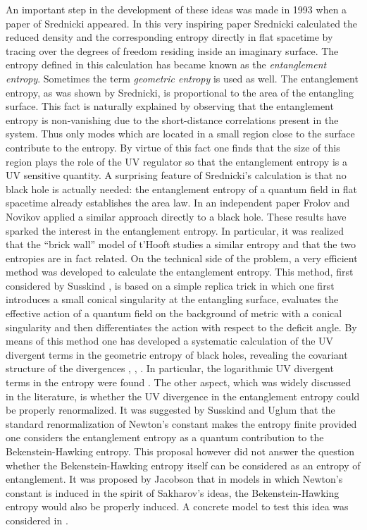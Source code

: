 \documentclass[12pt]{article}
\begin{document}
An important step in the development of these ideas was made in 1993 when a  paper of Srednicki \cite{Srednicki:1993im} appeared. In this very inspiring paper 
Srednicki calculated the reduced density and the corresponding entropy directly in flat spacetime by tracing over the degrees of freedom residing inside  an imaginary surface. 
The entropy defined in this calculation has became known as the {\it entanglement entropy}. Sometimes the term {\it geometric entropy} is used as well. The entanglement entropy, as was shown by Srednicki, is proportional to the area of the entangling surface.  This fact  is naturally explained by observing that the entanglement entropy is non-vanishing due to the
short-distance correlations present in the system. Thus only modes which are located in a small region close to the surface contribute to the entropy. By virtue of this fact one finds that the size of this region plays the role of the UV regulator so that the entanglement entropy is a UV sensitive quantity. A surprising feature of Srednicki's calculation is that no black hole is actually needed: the entanglement entropy of a quantum field in flat spacetime  already establishes the area law. In an independent paper Frolov and Novikov \cite{Frolov:1993ym} applied a  similar approach directly to a black hole.  
These results have sparked the interest in the entanglement entropy. In particular, it was realized that the ``brick wall'' model of t'Hooft studies a similar entropy and that the two entropies are in fact related.  On the technical side of the problem,  a very efficient method was developed  to calculate the entanglement entropy.
This method, first considered by Susskind \cite{Susskind:1993ws}, is based on a simple replica trick in which one first introduces a small conical singularity at the entangling surface, evaluates  the effective action of a quantum field on the background of metric with a conical singularity and then differentiates the action with respect to the deficit angle. By means of this method one has developed a systematic calculation of the UV divergent terms in the geometric entropy of black holes, revealing the covariant structure of the divergences \cite{Callan:1994py}, \cite{Solodukhin:1994st}, \cite{Fursaev:1995ef}. In particular, the logarithmic UV divergent terms in the entropy were found \cite{Solodukhin:1994yz}. 
The other aspect, which was widely discussed in the literature, is whether the UV divergence in the entanglement entropy could be properly renormalized.
It was suggested by Susskind and Uglum \cite{Susskind:1994sm} that the standard renormalization of Newton's constant makes the entropy finite provided one considers the entanglement entropy as a quantum contribution to the Bekenstein-Hawking entropy.  This proposal however did not answer the question whether the  Bekenstein-Hawking entropy itself can be considered
as an entropy of entanglement. It was proposed by Jacobson \cite{Jacobson:1994iw} that in models in which Newton's constant is induced in the spirit of Sakharov's ideas, 
the Bekenstein-Hawking entropy would also be properly induced. A concrete model to test this idea was considered in \cite{Frolov:1996aj}. 
\end{document}

